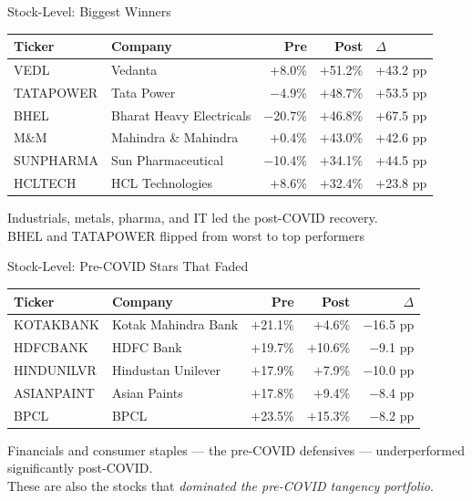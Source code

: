 \documentclass[aspectratio=169]{beamer}
\begin{document}
\begin{frame}{Stock-Level: Biggest Winners}
  \centering
  \begin{tabular}{llrrl}
    \toprule
    \textbf{Ticker} & \textbf{Company} & \textbf{Pre} & \textbf{Post} & \textbf{$\Delta$} \\
    \midrule
    VEDL      & Vedanta                  & $+$8.0\%  & $+$51.2\% & \textcolor{postcovid}{+43.2 pp} \\
    TATAPOWER & Tata Power               & $-$4.9\%  & $+$48.7\% & \textcolor{postcovid}{+53.5 pp} \\
    BHEL      & Bharat Heavy Electricals & $-$20.7\% & $+$46.8\% & \textcolor{postcovid}{+67.5 pp} \\
    M\&M      & Mahindra \& Mahindra     & $+$0.4\%  & $+$43.0\% & \textcolor{postcovid}{+42.6 pp} \\
    SUNPHARMA & Sun Pharmaceutical       & $-$10.4\% & $+$34.1\% & \textcolor{postcovid}{+44.5 pp} \\
    HCLTECH   & HCL Technologies         & $+$8.6\%  & $+$32.4\% & \textcolor{postcovid}{+23.8 pp} \\
    \bottomrule
  \end{tabular}

  \vspace{0.6em}
  \small Industrials, metals, pharma, and IT led the post-COVID recovery.\\
  BHEL and TATAPOWER flipped from worst to top performers 
\end{frame}

\begin{frame}{Stock-Level: Pre-COVID Stars That Faded}
  \centering
  \begin{tabular}{llrrr}
    \toprule
    \textbf{Ticker} & \textbf{Company} & \textbf{Pre} & \textbf{Post} & \textbf{$\Delta$} \\
    \midrule
    KOTAKBANK  & Kotak Mahindra Bank & $+$21.1\% & $+$4.6\%  & \textcolor{precovid}{$-$16.5 pp} \\
    HDFCBANK   & HDFC Bank           & $+$19.7\% & $+$10.6\% & \textcolor{precovid}{$-$9.1 pp}  \\
    HINDUNILVR & Hindustan Unilever  & $+$17.9\% & $+$7.9\%  & \textcolor{precovid}{$-$10.0 pp} \\
    ASIANPAINT & Asian Paints        & $+$17.8\% & $+$9.4\%  & \textcolor{precovid}{$-$8.4 pp}  \\
    BPCL       & BPCL                & $+$23.5\% & $+$15.3\% & \textcolor{precovid}{$-$8.2 pp}  \\
    \bottomrule
  \end{tabular}

  \vspace{0.6em}
  \small Financials and consumer staples --- the pre-COVID defensives --- underperformed significantly post-COVID.\\
  These are also the stocks that \emph{dominated the pre-COVID tangency portfolio}.
\end{frame}
\end{document}
